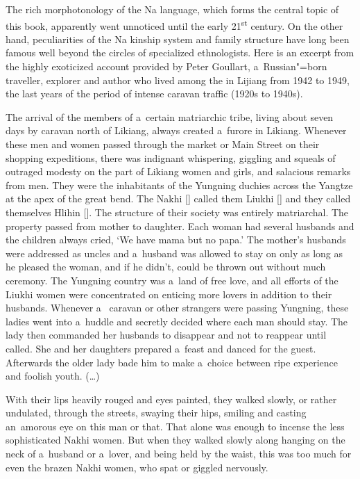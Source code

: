 The rich morphotonology of the Na language, which forms the central topic of this book, apparently went unnoticed until the early 21\textsuperscript{st} century. On the other hand, peculiarities of the Na kinship system and family structure have long been famous well beyond the circles of specialized ethnologists. Here is an excerpt from the highly exoticized account provided by Peter Goullart, a~Russian"=born traveller, explorer and author who lived among the  in Lijiang from 1942 to 1949, the last years of the period of intense caravan traffic (1920s to 1940s).

\newenvironment{amquote}{ 
\item\relax}
{\endlist}

\begin{amquote}
	The arrival of the members of a~certain matriarchic tribe, living about seven days by caravan
	north of Likiang, always created a~furore in Likiang. Whenever these men and women passed through
	the market or Main Street on their shopping expeditions, there was indignant whispering, giggling
	and squeals of outraged modesty on the part of Likiang women and girls, and salacious remarks from
	men. They were the inhabitants of the Yungning duchies across the Yangtze at the apex of the great
	bend. The Nakhi [] called them Liukhi [] and they called themselves Hlihin []. The structure of their
	society was entirely matriarchal. The property passed from mother to daughter. Each woman had
	several husbands and the children always cried, ‘We have mama but no papa.’ The mother’s husbands
	were addressed as uncles and a~husband was allowed to stay on only as long as he pleased the
	woman, and if he didn’t, could be thrown out without much ceremony. The Yungning country was a~land of free love, and all efforts of the Liukhi women were concentrated on enticing more lovers
	in addition to their husbands. Whenever a~ caravan or other strangers were passing
	Yungning, these ladies went into a~huddle and secretly decided where each man should stay. The
	lady then commanded her husbands to disappear and not to reappear until called. She and her
	daughters prepared a~feast and danced for the guest. Afterwards the older lady bade him to make a~choice between ripe experience and foolish youth. ({\dots})
	
	With their lips heavily rouged and eyes painted, they walked slowly, or rather undulated, through
	the streets, swaying their hips, smiling and casting an~amorous eye on this man or that. That
	alone was enough to incense the less sophisticated Nakhi women. But when they walked slowly along
	hanging on the neck of a~husband or a~lover, and being held by the waist, this was too much for
	even the brazen Nakhi women, who spat or giggled nervously.~\citep[Chapter~3]{goullart1955}
\end{amquote}



